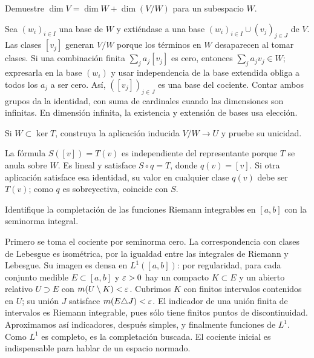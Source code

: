 \begin{ejercicio}\label{ej:v2-l13-2}
Demuestre $\dim V=\dim W+\dim(V/W)$ para un subespacio $W$.
\end{ejercicio}
\begin{solucion}
Sea $(w_i)_{i\in I}$ una base de $W$ y extiéndase a una base $(w_i)_{i\in I}\cup(v_j)_{j\in J}$ de $V$. Las clases $[v_j]$ generan $V/W$ porque los términos en $W$ desaparecen al tomar clases. Si una combinación finita $\sum_j a_j[v_j]$ es cero, entonces $\sum_ja_jv_j\in W$; expresarla en la base $(w_i)$ y usar independencia de la base extendida obliga a todos los $a_j$ a ser cero. Así, $([v_j])_{j\in J}$ es una base del cociente. Contar ambos grupos da la identidad, con suma de cardinales cuando las dimensiones son infinitas. En dimensión infinita, la existencia y extensión de bases usa elección.
\end{solucion}

\begin{ejercicio}\label{ej:v2-l13-3}
Si $W\subset\ker T$, construya la aplicación inducida $V/W\to U$ y pruebe su unicidad.
\end{ejercicio}
\begin{solucion}
La fórmula $S([v])=T(v)$ es independiente del representante porque $T$ se anula sobre $W$. Es lineal y satisface $S\circ q=T$, donde $q(v)=[v]$. Si otra aplicación satisface esa identidad, su valor en cualquier clase $q(v)$ debe ser $T(v)$; como $q$ es sobreyectiva, coincide con $S$.
\end{solucion}

\begin{ejercicio}\label{ej:v2-l16-1}
Identifique la completación de las funciones Riemann integrables en $[a,b]$ con la seminorma integral.
\end{ejercicio}
\begin{solucion}
Primero se toma el cociente por seminorma cero. La correspondencia con clases de Lebesgue es isométrica, por la igualdad entre las integrales de Riemann y Lebesgue. Su imagen es densa en $L^1([a,b])$: por regularidad, para cada conjunto medible $E\subset[a,b]$ y $\varepsilon>0$ hay un compacto $K\subset E$ y un abierto relativo $U\supset E$ con $m(U\setminus K)<\varepsilon$. Cubrimos $K$ con finitos intervalos contenidos en $U$; su unión $J$ satisface $m(E\triangle J)<\varepsilon$. El indicador de una unión finita de intervalos es Riemann integrable, pues sólo tiene finitos puntos de discontinuidad. Aproximamos así indicadores, después simples, y finalmente funciones de $L^1$. Como $L^1$ es completo, es la completación buscada. El cociente inicial es indispensable para hablar de un espacio normado.
\end{solucion}

